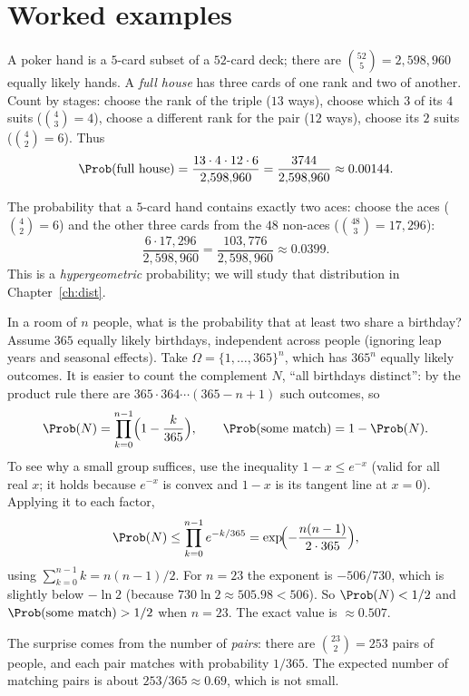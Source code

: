 \section{Worked examples}

\begin{example}\label{ex:fullhouse}
A poker hand is a $5$-card subset of a $52$-card deck; there are
$\binom{52}5=2{,}598{,}960$ equally likely hands. A \emph{full house} has three
cards of one rank and two of another. Count by stages: choose the rank of the
triple ($13$ ways), choose which $3$ of its $4$ suits ($\binom43=4$), choose a
different rank for the pair ($12$ ways), choose its $2$ suits
($\binom42=6$). Thus
\[
\Prob(\text{full house})=\frac{13\cdot 4\cdot 12\cdot 6}{2{,}598{,}960}
=\frac{3744}{2{,}598{,}960}\approx 0.00144 .
\]
\end{example}

\begin{example}\label{ex:aces}
The probability that a $5$-card hand contains exactly two aces: choose the aces
($\binom42=6$) and the other three cards from the $48$ non-aces
($\binom{48}3=17{,}296$):
\[
\frac{6\cdot 17{,}296}{2{,}598{,}960}=\frac{103{,}776}{2{,}598{,}960}\approx 0.0399.
\]
This is a \emph{hypergeometric} probability; we will study that distribution in
Chapter~\ref{ch:dist}.
\end{example}

\begin{example}\label{ex:birthday}
In a room of $n$ people, what is the probability that at least two share a
birthday? Assume $365$ equally likely birthdays, independent across people
(ignoring leap years and seasonal effects). Take
$\Omega=\{1,\dots,365\}^n$, which has $365^n$ equally likely outcomes. It is
easier to count the complement $N$, ``all birthdays distinct'': by the product
rule there are $365\cdot364\cdots(365-n+1)$ such outcomes, so
\[
\Prob(N)=\prod_{k=0}^{n-1}\Bigl(1-\frac k{365}\Bigr),
\qquad
\Prob(\text{some match})=1-\Prob(N).
\]
To see why a small group suffices, use the inequality $1-x\le e^{-x}$ (valid
for all real $x$; it holds because $e^{-x}$ is convex and $1-x$ is its tangent
line at $x=0$). Applying it to each factor,
\[
\Prob(N)\le\prod_{k=0}^{n-1}e^{-k/365}=\exp\!\Bigl(-\frac{n(n-1)}{2\cdot 365}\Bigr),
\]
using $\sum_{k=0}^{n-1}k=n(n-1)/2$. For $n=23$ the exponent is $-506/730$,
which is slightly below $-\ln 2$ (because $730\ln 2\approx 505.98<506$). So
$\Prob(N)<1/2$ and $\Prob(\text{some match})>1/2$ when $n=23$. The exact value
is $\approx 0.507$.

The surprise comes from the number of \emph{pairs}: there are
$\binom{23}2=253$ pairs of people, and each pair matches with probability
$1/365$. The expected number of matching pairs is about $253/365\approx 0.69$,
which is not small.
\end{example}


